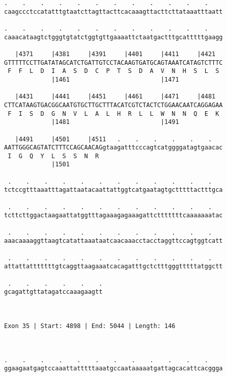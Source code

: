 \documentclass{article}
\begin{document}
\begin{Verbatim}
.    .    .    .    .    .    .    .    .    .    .    .    
caagccctccatatttgtaatcttagttacttcacaaagttacttcttataaatttaatt
                                                            
.    .    .    .    .    .    .    .    .    .    .    .    
caaacataagtctgggtgtatctggtgttgaaaattctaatgactttgcatttttgaagg
                                                            
   |4371     |4381     |4391     |4401     |4411     |4421  
GTTTTTCCTTGATATAGCATCTGATTGTCCTACAAGTGATGCAGTAAATCATAGTCTTTC
 F  F  L  D  I  A  S  D  C  P  T  S  D  A  V  N  H  S  L  S 
             |1461                         |1471            
  
   |4431     |4441     |4451     |4461     |4471     |4481  
CTTCATAAGTGACGGCAATGTGCTTGCTTTACATCGTCTACTCTGGAACAATCAGGAGAA
 F  I  S  D  G  N  V  L  A  L  H  R  L  L  W  N  N  Q  E  K 
             |1481                         |1491            
  
   |4491     |4501     |4511   .    .    .    .    .    .   
AATTGGGCAGTATCTTTCCAGCAACAGgtaagatttcccagtcatggggatagtgaacac
 I  G  Q  Y  L  S  S  N  R                                  
             |1501                                          
  
 .    .    .    .    .    .    .    .    .    .    .    .   
tctccgtttaaatttagattaatacaattattggtcatgaatagtgctttttactttgca
                                                            
 .    .    .    .    .    .    .    .    .    .    .    .   
tcttcttggactaagaattatggtttagaaagagaaagattctttttttcaaaaaaatac
                                                            
 .    .    .    .    .    .    .    .    .    .    .    .   
aaacaaaaggttaagtcatattaaataatcaacaaacctacctaggttccagtggtcatt
                                                            
 .    .    .    .    .    .    .    .    .    .    .    .   
attattatttttttgtcaggttaagaaatcacagatttgctctttgggtttttatggctt
                                                            
 .    .    .    .    .    .
gcagattgttatagatccaaagaagtt
                           
                           
 
Exon 35 | Start: 4898 | End: 5044 | Length: 146



.    .    .    .    .    .    .    .    .    .    .    .    
ggaagaatgagtccaaattatttttaaatgccaataaaaatgattagcacattcacggga
                                                            

\end{Verbatim}
\end{document}
